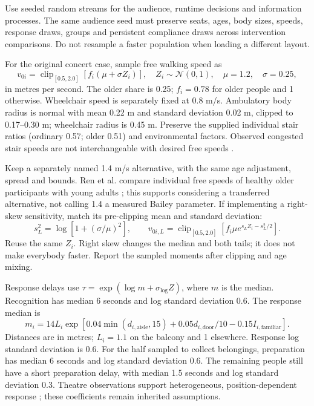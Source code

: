 \documentclass[11pt,a4paper]{article}
\newcommand{\clip}{\operatorname{clip}}
\begin{document}
Use seeded random streams for the audience, runtime decisions and information processes. The same audience seed must preserve seats, ages, body sizes, speeds, response draws, groups and persistent compliance draws across intervention comparisons. Do not resample a faster population when loading a different layout.

For the original concert case, sample free walking speed as
\begin{equation}\label{impl:eq2}
 v_{0i}=\clip_{[0.5,2.0]}\!\left[f_i(\mu+\sigma Z_i)\right],
 \quad Z_i\sim\mathcal N(0,1),\quad \mu=1.2,\quad\sigma=0.25,
\end{equation}
in metres per second. The older share is 0.25; $f_i=0.78$ for older people and 1 otherwise. Wheelchair speed is separately fixed at 0.8 m/s. Ambulatory body radius is normal with mean 0.22 m and standard deviation 0.02 m, clipped to 0.17--0.30 m; wheelchair radius is 0.45 m. Preserve the supplied individual stair ratios (ordinary 0.57; older 0.51) and environmental factors. Observed congested stair speeds are not interchangeable with desired free speeds \cite{nist}.

Keep a separately named 1.4 m/s alternative, with the same age adjustment, spread and bounds. Ren et al. compare individual free speeds of healthy older participants with young adults \cite{ren}; this supports considering a transferred alternative, not calling 1.4 a measured Bailey parameter. If implementing a right-skew sensitivity, match its pre-clipping mean and standard deviation:
\begin{equation}\label{impl:eq3}
 s_L^2=\log\!\left[1+(\sigma/\mu)^2\right],\qquad
 v_{0i,L}=\clip_{[0.5,2.0]}\!\left[f_i\mu e^{s_LZ_i-s_L^2/2}\right].
\end{equation}
Reuse the same $Z_i$. Right skew changes the median and both tails; it does not make everybody faster. Report the sampled moments after clipping and age mixing.

Response delays use $\tau=\exp(\log m+\sigma_{\log}Z)$, where $m$ is the median. Recognition has median 6 seconds and log standard deviation 0.6. The response median is
\begin{equation}\label{impl:eq4}
 m_i=14L_i\exp\!\left[0.04\min(d_{i,\mathrm{aisle}},15)
 +0.05d_{i,\mathrm{door}}/10-0.15I_{i,\mathrm{familiar}}\right].
\end{equation}
Distances are in metres; $L_i=1.1$ on the balcony and 1 elsewhere. Response log standard deviation is 0.6. For the half sampled to collect belongings, preparation has median 6 seconds and log standard deviation 0.6. The remaining people still have a short preparation delay, with median 1.5 seconds and log standard deviation 0.3. Theatre observations support heterogeneous, position-dependent response \cite{hopkin}; these coefficients remain inherited assumptions.
\end{document}
